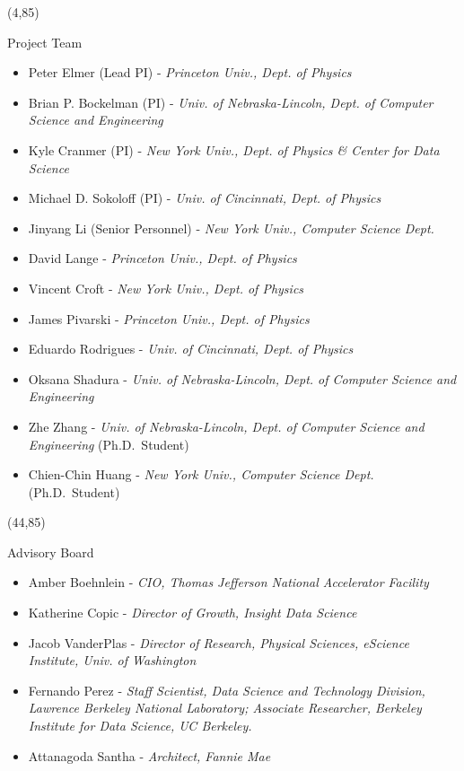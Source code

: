 \documentclass[final]{beamer}
\begin{document}
\begin{frame}{}
\begin{textblock}{38.0}(4,85)
\begin{block}{Project Team}
\begin{itemize}
\item Peter Elmer (Lead PI) - {\it Princeton Univ., Dept. of Physics}
\item Brian P. Bockelman (PI) - {\it Univ. of Nebraska-Lincoln, Dept. of Computer Science and Engineering}
\item Kyle Cranmer (PI) - {\it New York Univ., Dept. of Physics \& Center for Data Science}
\item Michael D. Sokoloff (PI) - {\it Univ. of Cincinnati, Dept. of Physics}
\item Jinyang Li (Senior Personnel) - {\it New York Univ., Computer Science Dept.}
\item David Lange - {\it Princeton Univ., Dept. of Physics}
\item Vincent Croft - {\it New York Univ., Dept. of Physics}
\item James Pivarski - {\it Princeton Univ., Dept. of Physics}
\item Eduardo Rodrigues - {\it Univ. of Cincinnati, Dept. of Physics}
\item Oksana Shadura - {\it Univ. of Nebraska-Lincoln, Dept. of Computer Science and Engineering}
\item Zhe Zhang - {\it Univ. of Nebraska-Lincoln, Dept. of Computer Science and Engineering} (Ph.D.\ Student)
\item Chien-Chin Huang - {\it New York Univ., Computer Science Dept.} (Ph.D.\ Student)
\end{itemize}
\end{block}
\end{textblock}

\begin{textblock}{38.0}(44,85)
\begin{block}{Advisory Board}
\begin{itemize}
\item Amber Boehnlein - {\it CIO, Thomas Jefferson National Accelerator Facility}
\item Katherine Copic - {\it Director of Growth, Insight Data Science}
\item Jacob VanderPlas - {\it Director of Research, Physical Sciences, eScience Institute, Univ. of Washington}
\item Fernando Perez - {\it Staff Scientist, Data Science and Technology Division, Lawrence Berkeley National Laboratory; Associate Researcher, Berkeley Institute for Data Science, UC Berkeley.}
\item Attanagoda Santha - {\it Architect, Fannie Mae}
\end{itemize}
\end{block}
\end{textblock}




\end{frame}
\end{document}
